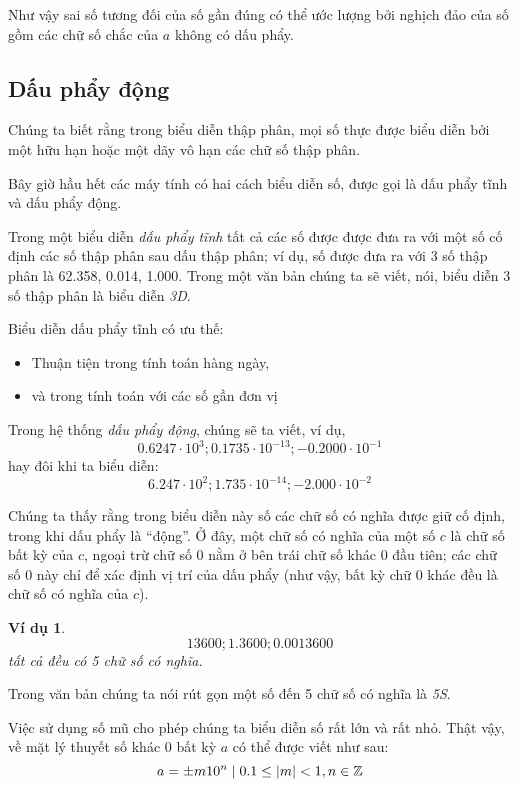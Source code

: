 \documentclass{book}
\newtheorem{exmp}{Ví dụ}[chapter]
\DeclarePairedDelimiter\abs{\lvert}{\rvert}%
\begin{document}
Như vậy sai số tương đối của số gần đúng có thể ước lượng bởi nghịch đảo của số
gồm các chữ số chắc của \(a\) không có dấu phẩy.

\subsection{Dấu phẩy động}

Chúng ta biết rằng trong biểu diễn thập phân, mọi số thực được biểu diễn bởi một
hữu hạn hoặc một dãy vô hạn các chữ số thập phân.

Bây giờ hầu hết các máy tính có hai cách biểu diễn số, được gọi là dấu phẩy tĩnh
và dấu phẩy động.

Trong một biểu diễn \emph{dấu phẩy tĩnh} tất cả các số được được đưa ra với một
số cố định các số thập phân sau dấu thập phân; ví dụ, số được đưa ra với 3 số
thập phân là \num{62.358}, \num{0.014}, \num{1.000}. Trong một văn bản chúng ta
sẽ viết, nói, biểu diễn 3 số thập phân là biểu diễn \emph{3D}.

Biểu diễn dấu phẩy tĩnh có ưu thế:
\begin{itemize}
    \item Thuận tiện trong tính toán hàng ngày,
    \item và trong tính toán với các số gần đơn vị
\end{itemize}

Trong hệ thống \emph{dấu phẩy động}, chúng sẽ ta viết, ví dụ,
\[\num{0.6247} \cdot 10^3; \num{0.1735} \cdot 10^{-13}; \num{-0.2000} \cdot 10^{-1}\]
hay đôi khi ta biểu diễn:
\[\num{6.247} \cdot 10^2; \num{1.735} \cdot 10^{-14}; \num{-2.000} \cdot 10^{-2}\]

Chúng ta thấy rằng trong biểu diễn này số các chữ số có nghĩa được giữ cố định,
trong khi dấu phẩy là ``động''. Ở đây, một chữ số có nghĩa của một số \(c\) là
chữ số bất kỳ của \(c\), ngoại trừ chữ số \(0\) nằm ở bên trái chữ số khác \(0\)
đầu tiên; các chữ số \(0\) này chỉ để xác định vị trí của dấu phẩy (như vậy, bất
kỳ chữ \(0\) khác đều là chữ số có nghĩa của \(c\)).

\begin{exmp}
    \[\num{13600}; \num{1.3600}; \num{0.0013600}\]
    tất cả đều có 5 chữ số có nghĩa.
\end{exmp}

Trong văn bản chúng ta nói rút gọn một số đến 5 chữ số có nghĩa là \emph{5S}.

Việc sử dụng số mũ cho phép chúng ta biểu diễn số rất lớn và rất nhỏ. Thật vậy,
về mặt lý thuyết số khác 0 bất kỳ \(a\) có thể được viết như sau:
\[a = \pm m 10^n \mid 0.1 \leq \abs{m} < 1, n \in \mathbb{Z}\]
\end{document}
